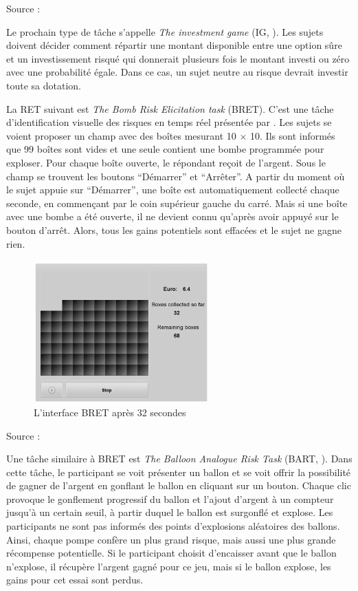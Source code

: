 \documentclass[12pt]{article}
\begin{document}
Source : \citet{Eckel2002}

Le prochain type de tâche s'appelle \emph{The investment game} (IG,
\citet{Gneezy1997}). Les sujets doivent décider comment répartir une
montant disponible entre une option sûre et un investissement risqué qui
donnerait plusieurs fois le montant investi ou zéro avec une probabilité
égale. Dans ce cas, un sujet neutre au risque devrait investir toute sa
dotation.

La RET suivant est \emph{The Bomb Risk Elicitation task} (BRET). C'est
une tâche d'identification visuelle des risques en temps réel présentée
par \citet{CroFil2013b}. Les sujets se voient proposer un champ avec des
boîtes mesurant 10 × 10. Ils sont informés que 99 boîtes sont vides et
une seule contient une bombe programmée pour exploser. Pour chaque boîte
ouverte, le répondant reçoit de l'argent. Sous le champ se trouvent les
boutons ``Démarrer'' et ``Arrêter''. A partir du moment où le sujet
appuie sur ``Démarrer'', une boîte est automatiquement collecté chaque
seconde, en commençant par le coin supérieur gauche du carré. Mais si
une boîte avec une bombe a été ouverte, il ne devient connu qu'après
avoir appuyé sur le bouton d'arrêt. Alors, tous les gains potentiels
sont effacées et le sujet ne gagne rien.

\begin{figure}
\centering
\includegraphics[width=0.6\textwidth,height=0.3\textheight]{BRET.png}
\caption{L'interface BRET après 32 secondes}
\end{figure}

Source : \citet{CroFil2013b}

Une tâche similaire à BRET est \emph{The Balloon Analogue Risk Task}
(BART, \citet{Hunt2005}). Dans cette tâche, le participant se voit
présenter un ballon et se voit offrir la possibilité de gagner de
l'argent en gonflant le ballon en cliquant sur un bouton. Chaque clic
provoque le gonflement progressif du ballon et l'ajout d'argent à un
compteur jusqu'à un certain seuil, à partir duquel le ballon est
surgonflé et explose. Les participants ne sont pas informés des points
d'explosions aléatoires des ballons. Ainsi, chaque pompe confère un plus
grand risque, mais aussi une plus grande récompense potentielle. Si le
participant choisit d'encaisser avant que le ballon n'explose, il
récupère l'argent gagné pour ce jeu, mais si le ballon explose, les
gains pour cet essai sont perdus.
\end{document}
